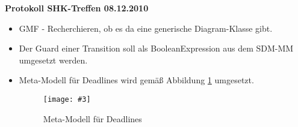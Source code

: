 \documentclass[11pt,a4paper]{article}
\newcommand{\inclpic}[5]{\begin{figure}[#1]\begin{center}\texttt{[image: \#3]}\caption{#4}\label{pic:#5}\end{center}\end{figure}}
\begin{document}
\begin{center}

\textbf{\huge Protokoll SHK-Treffen 08.12.2010}\\[0.9cm]

\end{center}

\begin{itemize}
  \item GMF - Recherchieren, ob es da eine generische Diagram-Klasse gibt.
  \item Der Guard einer Transition soll als BooleanExpression aus dem SDM-MM
  umgesetzt werden.
  \item Meta-Modell für Deadlines wird gemäß Abbildung \ref{pic:deadlines-MM}
  umgesetzt.
  \inclpic{ht}{0.5}{./images/DSC01805.jpg}{Meta-Modell für
  Deadlines}{deadlines-MM}
\end{itemize}
\end{document}

